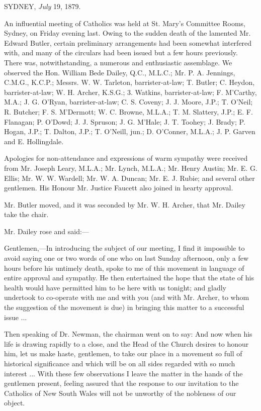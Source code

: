 
SYDNEY, \emph{July} 19, 1879.

An influential meeting of Catholics was held at St.
Mary's Committee Rooms, Sydney, on Friday evening last. Owing to the
sudden death of the lamented Mr. Edward Butler, certain preliminary
arrangements had been somewhat interfered with, and many of the
circulars had been issued but a few hours previously. There was,
notwithstanding, a numerous and enthusiastic assemblage. We observed
the Hon. William Bede Dailey, Q.C., M.L.C.; Mr. P. A. Jennings, C.M.G.,
K.C.P.; Messrs. W. W. Tarleton, barrister-at-law; T. Butler; C. Heydon,
barrister-at-law; W. H. Archer, K.S.G.; 3. Watkins, barrister-at-law;
F. M'Carthy, M.A.; J. G. O'Ryan, barrister-at-law; C. S. Coveny; J. J.
Moore, J.P.; T. O'Neil; R. Butcher; F. S. M'Dermott; W. C. Browne,
M.L.A.; T. M. Slattery, J.P.; E. F. Flanagan; P. O'Dowd; J. J. Spruson;
J. G. M'Hale; J. T. Toohey; J. Brady; P. Hogan, J.P.; T. Dalton, J.P.;
T. O'Neill, jun.; D. O'Conner, M.L.A.; J.
P. Garven and E. Hollingdale.

Apologies for non-attendance and expressions of warm sympathy were
received from Mr. Joseph Leary, M.L.A.; Mr. Lynch, M.L.A.; Mr. Henry
Austin; Mr. E. G. Ellis; Mr. W. W. Wardell; Mr. W. A. Duncan; Mr. E.
J. Rubie; and several other gentlemen. His Honour Mr. Justice Faucett
also joined in hearty approval.

Mr. Butler moved, and it was seconded by Mr. W. H. Archer, that Mr.
Dailey take the chair.

Mr. Dailey rose and said:—

Gentlemen,—In introducing the subject of our meeting, I find it
impossible to avoid saying one or two words of one who on last Sunday
afternoon, only a few hours before his untimely death, spoke to me of
this movement in language of entire approval and sympathy. He then
entertained the hope that the state of his health would have permitted
him to be here with us tonight; and gladly undertook to co-operate
with me and with you (and with Mr. Archer, to whom the suggestion of
the movement is due) in bringing this matter to a successful issue ...

Then speaking of Dr. Newman, the chairman went on to say: And now
when his life is drawing rapidly to a close, and the Head of the
Church desires to honour him, let us make haste, gentlemen, to take
our place in a movement so full of historical significance and which
will be on all sides regarded with so much interest ... With these few
observations I leave the matter in the hands of the gentlemen present,
feeling assured that the response to our invitation to the Catholics
of New South Wales will not be unworthy of the nobleness of our
object.

